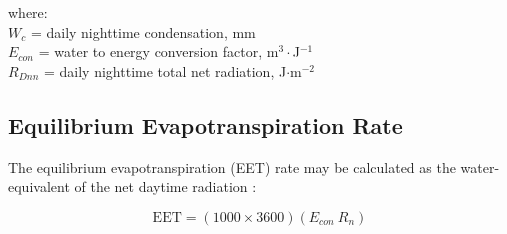 \noindent where: \\
\indent $W_c$ = daily nighttime condensation, mm\\
\indent $E_{con}$ = water to energy conversion factor, m$^{3}\cdot$J$^{-1}$\\
\indent $R_{Dnn}$ = daily nighttime total net radiation, J$\cdot$m$^{-2}$\\

\subsection{Equilibrium Evapotranspiration Rate}
\label{sec:eet}
The equilibrium evapotranspiration (EET) rate may be calculated as the water-equivalent of the net daytime radiation \parencite[Eq. 5]{prentice93}:

\begin{equation}
\label{eq:eet}
	\text{EET} = \left(1000\times 3600\right) \left(E_{con}\: R_n\right)
\end{equation}

